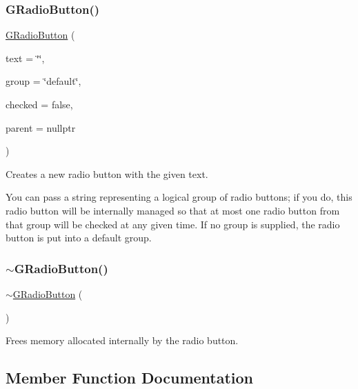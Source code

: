 \subsubsection{\texorpdfstring{G\+Radio\+Button()}{GRadioButton()}}
{\footnotesize\ttfamily \mbox{\hyperlink{classsgl_1_1GRadioButton}{G\+Radio\+Button}} (\begin{DoxyParamCaption}\item[{const std\+::string \&}]{text = {\ttfamily \char`\"{}\char`\"{}},  }\item[{const std\+::string \&}]{group = {\ttfamily \char`\"{}default\char`\"{}},  }\item[{bool}]{checked = {\ttfamily false},  }\item[{Q\+Widget $\ast$}]{parent = {\ttfamily nullptr} }\end{DoxyParamCaption})}



Creates a new radio button with the given text. 

You can pass a string representing a logical group of radio buttons; if you do, this radio button will be internally managed so that at most one radio button from that group will be checked at any given time. If no group is supplied, the radio button is put into a default group. \mbox{\label{classsgl_1_1GRadioButton_a424ac187807b9f40966b28b47b13121f}} 
\subsubsection{\texorpdfstring{$\sim$\+G\+Radio\+Button()}{~GRadioButton()}}
{\footnotesize\ttfamily $\sim$\mbox{\hyperlink{classsgl_1_1GRadioButton}{G\+Radio\+Button}} (\begin{DoxyParamCaption}{ }\end{DoxyParamCaption})\hspace{0.3cm}{\ttfamily [override]}}



Frees memory allocated internally by the radio button. 



\subsection{Member Function Documentation}
\mbox{\label{classsgl_1_1GInteractor_a02f20ea6edfa0671f31c4c648a253833}} 
